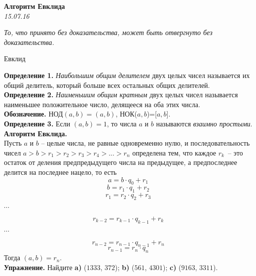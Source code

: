 \begin{center}
\textbf{\Large   Алгоритм Евклида }\\
\textit{15.07.16}
\end{center}

\epigraph{\it То, что принято без доказательства, может быть отвергнуто без доказательства.}{Евклид}

\indent \textbf{Определение 1.} \textit{Наибольшим общим делителем} двух целых чисел называется их общий делитель, который больше всех остальных общих делителей.\\
\indent \textbf{Определение 2.} \textit{Наименьшим общим кратным} двух целых чисел называется наименьшее положительное число, делящееся на оба этих числа.\\
\textbf{Обозначение.} НОД$(a,b)=(a,b)$, НОК($a,b$)=[$a,b$].\\
\textbf{Определение 3.} Если $(a,b)=1$, то числа $a$ и $b$ называются \textit{взаимно простыми}. 
\textbf{Алгоритм Евклида.}\\
Пусть $a$ и $b$ -- целые числа, не равные одновременно нулю, и последовательность чисел
$a > b > r_1 > r_2 > r_3 > r_4 > ... > r_n$
определена тем, что каждое $r_k$~-- это остаток от деления предпредыдущего числа на предыдущее, а предпоследнее делится на последнее нацело, то есть \\
\begin{equation*}
 a = b \cdot q_0 + r_1
\end{equation*}
\begin{equation*}
b = r_1  \cdot q_1 + r_2
\end{equation*}
\begin{equation*}
r_1 = r_2  \cdot q_2 + r_3
\end{equation*}
\begin{center} $\cdots$ \end{center}  
\begin{equation*}
r_{k-2} = r_{k-1}  \cdot q_{k-1} + r_k
\end{equation*}
\begin{center} $\cdots$ \end{center}
\begin{equation*}
r_{n-2} = r_{n-1}  \cdot q_{n-1}+ r_n
\end{equation*}
\begin{equation*}
r_{n-1} = r_n  \cdot q_n
\end{equation*}
Тогда $(a,b)=r_n$.\\
\textbf{Упражнение. } Найдите \textbf{a)} ($1333$, $372$);  \textbf{b)} ($561$, $4301$);   \textbf{c)} ($9163$, $3311$).




